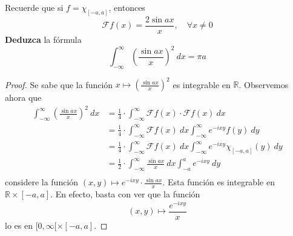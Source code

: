 \documentclass[12pt]{report}
\theoremstyle{largebreak}
\newcommand{\fou}[1]{\ensuremath{\mathcal{F}#1}}
\begin{document}
    \begin{excer}
        Recuerde que si $f=\chi_{[-a,a]}$, entonces
        \begin{equation*}
            \fou{f}(x)=\frac{2\sin ax}{x},\quad\forall x\neq0
        \end{equation*}
        \textbf{Deduzca} la fórmula
        \begin{equation*}
            \int_{ -\infty}^{\infty}\left(\frac{\sin ax}{x} \right)^2\:dx=\pi a
        \end{equation*}
    \end{excer}

    \begin{proof}


        Se sabe que la función $x\mapsto\left(\frac{\sin ax}{x}\right)^2$ es integrable en $\mathbb{R}$. Observemos ahora que
        \begin{equation*}
            \begin{split}
                \int_{-\infty}^{\infty}\left(\frac{\sin ax}{x}\right)^2\:dx&=\frac{1}{4}\cdot\int_{-\infty}^{\infty}\fou{f}(x)\cdot\fou{f}(x)\:dx\\
                &=\frac{1}{4}\cdot\int_{-\infty}^{\infty}\fou{f}(x)\:dx\int_{-\infty}^\infty e^{ -ixy}f(y)\:dy\\
                &=\frac{1}{4}\cdot\int_{-\infty}^{\infty}\fou{f}(x)\:dx\int_{-\infty}^\infty e^{ -ixy}\chi_{[-a,a]}(y)\:dy\\
                &=\frac{1}{2}\cdot\int_{-\infty}^{\infty}\frac{\sin ax}{x}\:dx\int_{-a}^a e^{ -ixy}\:dy\\
            \end{split}
        \end{equation*}
        considere la función $(x,y)\mapsto e^{-ixy}\cdot\frac{\sin ax}{x}$. Esta función es integrable en $\mathbb{R}\times[-a,a]$. En efecto, basta con ver que la función
        \begin{equation*}
            (x,y)\mapsto \frac{e^{-ixy}}{x}
        \end{equation*}
        lo es en $[0,\infty[\times[-a,a]$.%


\end{proof}
\end{document}

